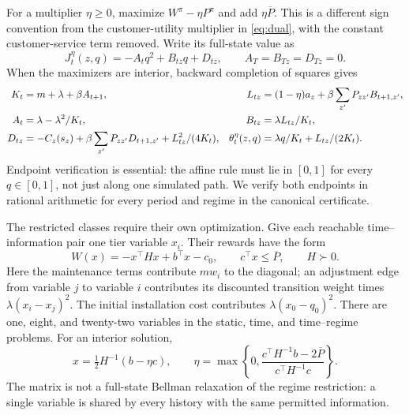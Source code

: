 \documentclass[11pt,letterpaper]{article}
\theoremstyle{definition}
\newcommand{\1}{\mathbf 1}
\begin{document}
For a multiplier $\eta\geq0$, maximize $W^\pi-\eta P^\pi$ and add $\eta\overline P$. This is a different sign convention from the customer-utility multiplier in \eqref{eq:dual}, with the constant customer-service term removed. Write its full-state value as
\begin{equation}\label{eq:riccati-form}
 J_t^\eta(z,q)=-A_tq^2+B_{tz}q+D_{tz},\qquad A_T=B_{Tz}=D_{Tz}=0.
\end{equation}
When the maximizers are interior, backward completion of squares gives
\begin{align}
 K_t&=m+\lambda+\beta A_{t+1},&
 L_{tz}&=(1-\eta)a_z+\beta\sum_{z'}P_{zz'}B_{t+1,z'},\notag\\
 A_t&=\lambda-\lambda^2/K_t,& B_{tz}&=\lambda L_{tz}/K_t,\label{eq:riccati}\\
 D_{tz}&=-C_z(s_z)+\beta\sum_{z'}P_{zz'}D_{t+1,z'}+L_{tz}^2/(4K_t),&
 \theta_t^\eta(z,q)&=\lambda q/K_t+L_{tz}/(2K_t).\notag
\end{align}
Endpoint verification is essential: the affine rule must lie in $[0,1]$ for every $q\in[0,1]$, not just along one simulated path. We verify both endpoints in rational arithmetic for every period and regime in the canonical certificate.

The restricted classes require their own optimization. Give each reachable time--information pair one tier variable $x_i$. Their rewards have the form
\begin{equation}\label{eq:restricted-qp}
 W(x)=-x^\top Hx+b^\top x-c_0,\qquad c^\top x\leq\overline P,
 \qquad H\succ0.
\end{equation}
Here the maintenance terms contribute $m w_i$ to the diagonal; an adjustment edge from variable $j$ to variable $i$ contributes its discounted transition weight times $\lambda(x_i-x_j)^2$. The initial installation cost contributes $\lambda(x_0-q_0)^2$. There are one, eight, and twenty-two variables in the static, time, and time--regime problems. For an interior solution,
\[
 x=\tfrac12H^{-1}(b-\eta c),\qquad
 \eta=\max\left\{0,\frac{c^\top H^{-1}b-2\overline P}{c^\top H^{-1}c}\right\}.
\]
The matrix is not a full-state Bellman relaxation of the regime restriction: a single variable is shared by every history with the same permitted information.
\end{document}
